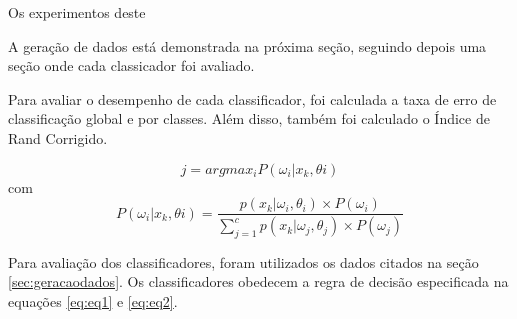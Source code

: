 

Os experimentos deste

A geração de dados está demonstrada na próxima seção, seguindo depois uma seção onde cada classicador foi avaliado.

Para avaliar o desempenho de cada classificador, foi calculada a taxa de erro de classificação global e por classes. Além disso, também foi calculado o Índice de Rand Corrigido.

\begin{equation}
\label{eq:eq1}
j = argmax_i P(\omega_{i} | x_{k},\theta{i})
\end{equation}
com
\begin{equation}
\label{eq:eq2}
P(\omega_{i} | x_{k},\theta{i}) = \dfrac{p(x_k| \omega_i, \theta_i) \times P(\omega_i)}{\sum_{j=1}^c p(x_k | \omega_j, \theta_j) \times P(\omega_j)}
\end{equation}

Para avaliação dos classificadores, foram utilizados os dados citados na seção \ref{sec:geracaodados}. Os classificadores obedecem a regra de decisão especificada na equações \ref{eq:eq1} e \ref{eq:eq2}.



